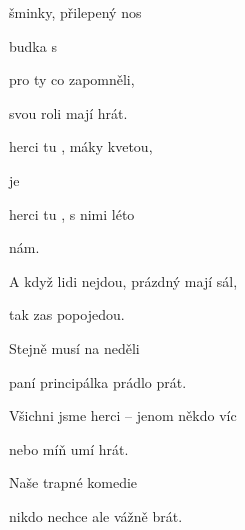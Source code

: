 
\zs
{} šminky, přilepený nos

budka s 

 pro ty co zapomněli,

 svou roli mají  hrát.
\ks
\zr

 herci tu , máky kvetou,

 je

 herci tu , s nimi léto

  nám.
\kr
\zs

A když lidi nejdou, prázdný mají sál,

tak zas popojedou.

Stejně musí na neděli

paní principálka prádlo prát.

\ks
\zr   \kr
\zs


Všichni jsme herci -- jenom někdo víc

nebo míň umí hrát.

Naše trapné komedie

nikdo nechce ale vážně brát.
\ks

\zr
\kr

\kp

